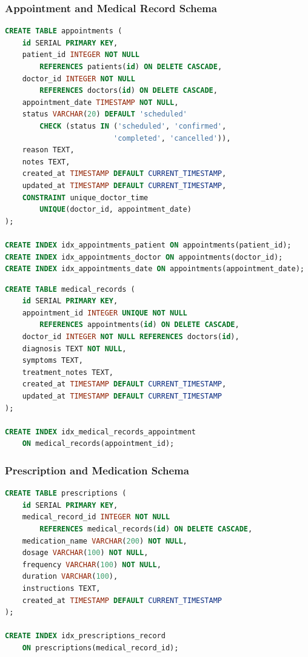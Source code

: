 \documentclass[11pt,a4paper]{article}
\begin{document}
\subsubsection{Appointment and Medical Record Schema}

\begin{lstlisting}[language=SQL, caption=Appointment Table Schema]
CREATE TABLE appointments (
    id SERIAL PRIMARY KEY,
    patient_id INTEGER NOT NULL 
        REFERENCES patients(id) ON DELETE CASCADE,
    doctor_id INTEGER NOT NULL 
        REFERENCES doctors(id) ON DELETE CASCADE,
    appointment_date TIMESTAMP NOT NULL,
    status VARCHAR(20) DEFAULT 'scheduled' 
        CHECK (status IN ('scheduled', 'confirmed', 
                         'completed', 'cancelled')),
    reason TEXT,
    notes TEXT,
    created_at TIMESTAMP DEFAULT CURRENT_TIMESTAMP,
    updated_at TIMESTAMP DEFAULT CURRENT_TIMESTAMP,
    CONSTRAINT unique_doctor_time 
        UNIQUE(doctor_id, appointment_date)
);

CREATE INDEX idx_appointments_patient ON appointments(patient_id);
CREATE INDEX idx_appointments_doctor ON appointments(doctor_id);
CREATE INDEX idx_appointments_date ON appointments(appointment_date);
\end{lstlisting}

\begin{lstlisting}[language=SQL, caption=Medical Record Table Schema]
CREATE TABLE medical_records (
    id SERIAL PRIMARY KEY,
    appointment_id INTEGER UNIQUE NOT NULL 
        REFERENCES appointments(id) ON DELETE CASCADE,
    doctor_id INTEGER NOT NULL REFERENCES doctors(id),
    diagnosis TEXT NOT NULL,
    symptoms TEXT,
    treatment_notes TEXT,
    created_at TIMESTAMP DEFAULT CURRENT_TIMESTAMP,
    updated_at TIMESTAMP DEFAULT CURRENT_TIMESTAMP
);

CREATE INDEX idx_medical_records_appointment 
    ON medical_records(appointment_id);
\end{lstlisting}

\subsubsection{Prescription and Medication Schema}

\begin{lstlisting}[language=SQL, caption=Prescription Table Schema]
CREATE TABLE prescriptions (
    id SERIAL PRIMARY KEY,
    medical_record_id INTEGER NOT NULL 
        REFERENCES medical_records(id) ON DELETE CASCADE,
    medication_name VARCHAR(200) NOT NULL,
    dosage VARCHAR(100) NOT NULL,
    frequency VARCHAR(100) NOT NULL,
    duration VARCHAR(100),
    instructions TEXT,
    created_at TIMESTAMP DEFAULT CURRENT_TIMESTAMP
);

CREATE INDEX idx_prescriptions_record 
    ON prescriptions(medical_record_id);
\end{lstlisting}
\end{document}
